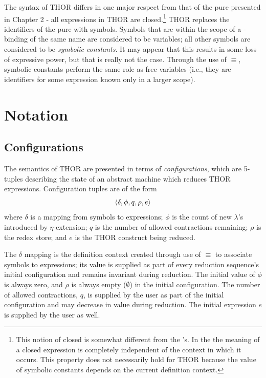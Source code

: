 The syntax of THOR differs in one major respect from that of the pure
\lambdacalculus{} presented in Chapter 2 - all expressions in THOR are
closed.\footnote{This notion of closed is somewhat different from the
\lambdacalculus's. In the \lambdacalculus{} the meaning of a closed expression
is completely independent of the context in which it occurs. This property does
not necessarily hold for THOR because the value of symbolic constants depends
on the current definition context.} THOR replaces the identifiers of the pure
\lambdacalculus{} with symbols. Symbols that are within the scope of a
-binding of the same name are considered to be variables; all other
symbols are considered to be \emph{symbolic constants}. It may appear that this results
in some loss of expressive power, but that is really not the case. Through the
use of \(\equiv\), symbolic constants perform the same role as free variables (i.e.,
they are identifiers for some expression known only in a larger scope).

\section{Notation}

\subsection{Configurations}

The semantics of THOR are presented in terms of \emph{configurations}, which are
5-tuples describing the state of an abstract machine which reduces THOR
expressions. Configuration tuples are of the form
\[
\langle \delta,\phi,q,\rho,e\rangle
\]
where \(\delta\) is a mapping from symbols to expressions; \(\phi\) is the count
of new \(\lambda\)'s introduced by \(\eta\)-extension; \(q\) is the number of
allowed contractions remaining; \(\rho\) is the redex store; and \(e\) is the
THOR construct being reduced.

The \(\delta\) mapping is the definition context created through use of \(\equiv\) to
associate symbols to expressions; its value is supplied as part of every
reduction sequence's initial configuration and remains invariant during
reduction. The initial value of \(\phi\) is always zero, and \(\rho\) is always
empty (\(\emptyset\)) in the initial configuration. The number of allowed
contractions, \(q\), is supplied by the user as part of the initial
configuration and may decrease in value during reduction. The initial expression
\(e\) is supplied by the user as well.

